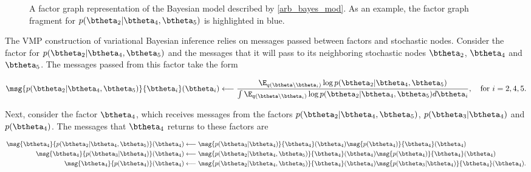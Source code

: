\documentclass[12pt]{article}
\theoremstyle{plain}
\theoremstyle{definition}
\theoremstyle{remark}
\begin{document}
\begin{figure}
\caption{
	A factor graph representation of the Bayesian model described by \eqref{arb_bayes_mod}. As an example,
	the factor graph fragment for $p (\btheta_2 | \btheta_4, \btheta_5)$ is highlighted in blue.
}
\label{fig:arb_bayes_mod_fg}
\end{figure}

The VMP construction of variational Bayesian inference relies on messages passed between factors and stochastic
nodes. Consider the factor for $p (\btheta_2 | \btheta_4, \btheta_5)$ and the messages that it will pass to its
neighboring stochastic nodes $\btheta_2$, $\btheta_4$ and $\btheta_5$. The messages passed from this
factor take the form

\[
	\msg{p (\btheta_2 | \btheta_4, \btheta_5)}{\btheta_i} (\btheta_i)
		\longleftarrow
			\frac{
				\E_{q(\btheta \setminus \btheta_i)} \log p (\btheta_2 | \btheta_4, \btheta_5)
			} {
				\int \E_{q(\btheta \setminus \btheta_i)} \log p (\btheta_2 | \btheta_4, \btheta_5) d\btheta_i
			},
	\quad \text{for $i = 2, 4, 5$.}
\]

\noindent Next, consider the factor $\btheta_4$, which receives messages from the factors
$p (\btheta_2 | \btheta_4, \btheta_5)$, $p (\btheta_3 | \btheta_4)$ and $p (\btheta_4)$. The messages that $\btheta_4$
returns to these factors are

\begin{align*}
	\msg{\btheta_4}{p (\btheta_2 | \btheta_4, \btheta_5)} (\btheta_4)
		&\longleftarrow
			\msg{p (\btheta_3 | \btheta_4)}{\btheta_4} (\btheta_4) \msg{p(\btheta_4)}{\btheta_4} (\btheta_4) \\
	\msg{\btheta_4}{p (\btheta_3 | \btheta_4)} (\btheta_4)
		&\longleftarrow
			\msg{p (\btheta_2 | \btheta_4, \btheta_5)}{\btheta_4} (\btheta_4)
			\msg{p (\btheta_4)}{\btheta_4} (\btheta_4) \\
	\msg{\btheta_4}{p (\btheta_4)} (\btheta_4)
		&\longleftarrow
			\msg{p (\btheta_2 | \btheta_4, \btheta_5)}{\btheta_4} (\btheta_4)
			\msg{p (\btheta_3 | \btheta_4)}{\btheta_4} (\btheta_4).
\end{align*}
\end{document}
